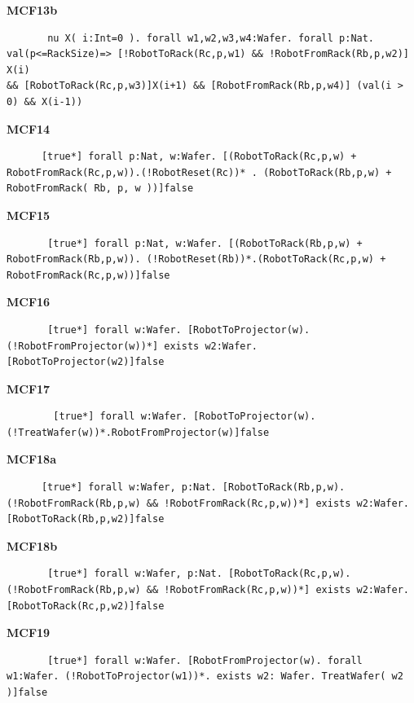 \documentclass[12pt]{report}
\begin{document}
    \textbf{MCF13b}
    \begin{lstlisting}
       nu X( i:Int=0 ). forall w1,w2,w3,w4:Wafer. forall p:Nat. val(p<=RackSize)=> [!RobotToRack(Rc,p,w1) && !RobotFromRack(Rb,p,w2)] X(i)
&& [RobotToRack(Rc,p,w3)]X(i+1) && [RobotFromRack(Rb,p,w4)] (val(i > 0) && X(i-1))
   \end{lstlisting}

    \textbf{MCF14}
    \begin{lstlisting}
      [true*] forall p:Nat, w:Wafer. [(RobotToRack(Rc,p,w) + RobotFromRack(Rc,p,w)).(!RobotReset(Rc))* . (RobotToRack(Rb,p,w) + RobotFromRack( Rb, p, w ))]false
    \end{lstlisting}

    \textbf{MCF15}
    \begin{lstlisting}
       [true*] forall p:Nat, w:Wafer. [(RobotToRack(Rb,p,w) + RobotFromRack(Rb,p,w)). (!RobotReset(Rb))*.(RobotToRack(Rc,p,w) + RobotFromRack(Rc,p,w))]false
    \end{lstlisting}

    \textbf{MCF16}
    \begin{lstlisting}
       [true*] forall w:Wafer. [RobotToProjector(w). (!RobotFromProjector(w))*] exists w2:Wafer. [RobotToProjector(w2)]false
    \end{lstlisting}

    \textbf{MCF17}
    \begin{lstlisting}
        [true*] forall w:Wafer. [RobotToProjector(w). (!TreatWafer(w))*.RobotFromProjector(w)]false
    \end{lstlisting}

    \textbf{MCF18a}
    \begin{lstlisting}
      [true*] forall w:Wafer, p:Nat. [RobotToRack(Rb,p,w).(!RobotFromRack(Rb,p,w) && !RobotFromRack(Rc,p,w))*] exists w2:Wafer. [RobotToRack(Rb,p,w2)]false
    \end{lstlisting}

    \textbf{MCF18b}
    \begin{lstlisting}
       [true*] forall w:Wafer, p:Nat. [RobotToRack(Rc,p,w).(!RobotFromRack(Rb,p,w) && !RobotFromRack(Rc,p,w))*] exists w2:Wafer.[RobotToRack(Rc,p,w2)]false
    \end{lstlisting}

    \textbf{MCF19}
    \begin{lstlisting}
       [true*] forall w:Wafer. [RobotFromProjector(w). forall w1:Wafer. (!RobotToProjector(w1))*. exists w2: Wafer. TreatWafer( w2 )]false
       \end{lstlisting}
\end{document}
